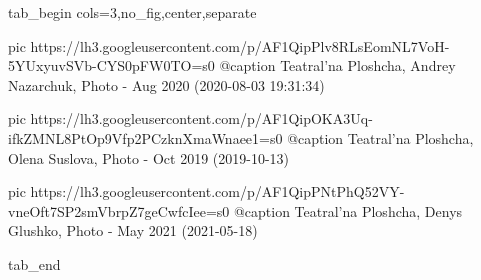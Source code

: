  
 
 
 
 

\ifcmt
  tab_begin cols=3,no_fig,center,separate

     pic https://lh3.googleusercontent.com/p/AF1QipPlv8RLsEomNL7VoH-5YUxyuvSVb-CYS0pFW0TO=s0
     @caption Teatral'na Ploshcha, Andrey Nazarchuk, Photo - Aug 2020 (2020-08-03 19:31:34)

     pic https://lh3.googleusercontent.com/p/AF1QipOKA3Uq-ifkZMNL8PtOp9Vfp2PCzknXmaWnaee1=s0
     @caption Teatral'na Ploshcha, Olena Suslova, Photo - Oct 2019 (2019-10-13) 

     pic https://lh3.googleusercontent.com/p/AF1QipPNtPhQ52VY-vneOft7SP2smVbrpZ7geCwfcIee=s0
     @caption Teatral'na Ploshcha, Denys Glushko, Photo - May 2021 (2021-05-18)

  tab_end
\fi
